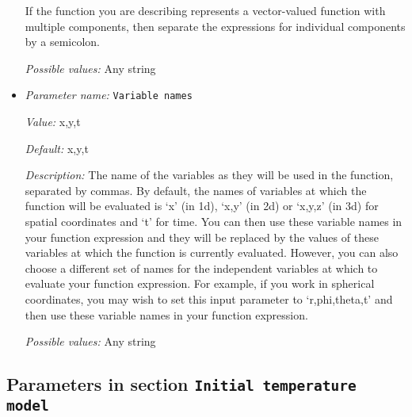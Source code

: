 \begin{itemize}
If the function you are describing represents a vector-valued function with multiple components, then separate the expressions for individual components by a semicolon.


{\it Possible values:} Any string
\item {\it Parameter name:} {\tt Variable names}
\label{parameters:Initial composition model/Function/Variable names}


{\it Value:} x,y,t


{\it Default:} x,y,t


{\it Description:} The name of the variables as they will be used in the function, separated by commas. By default, the names of variables at which the function will be evaluated is `x' (in 1d), `x,y' (in 2d) or `x,y,z' (in 3d) for spatial coordinates and `t' for time. You can then use these variable names in your function expression and they will be replaced by the values of these variables at which the function is currently evaluated. However, you can also choose a different set of names for the independent variables at which to evaluate your function expression. For example, if you work in spherical coordinates, you may wish to set this input parameter to `r,phi,theta,t' and then use these variable names in your function expression.


{\it Possible values:} Any string
\end{itemize}

\subsection{Parameters in section \tt Initial temperature model}
\label{parameters:Initial_20temperature_20model}

